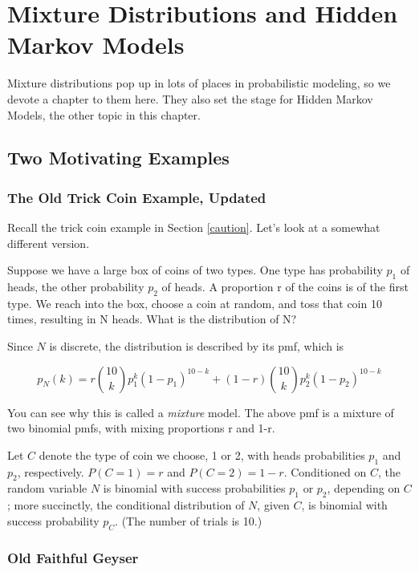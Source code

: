 \chapter{Mixture Distributions and Hidden Markov Models} 
\label{chap:mix}

Mixture distributions pop up in lots of places in probabilistic
modeling, so we devote a chapter to them here.  They also set the stage
for Hidden Markov Models, the other topic in this chapter.

\section{Two Motivating Examples}

\subsection{The Old Trick Coin Example, Updated}
\label{oldtrick}

Recall the trick coin example in Section \ref{caution}.  Let's look at a
somewhat different version.

Suppose we have a large box of coins of two types. One type has
probability $p_1$ of heads, the other probability $p_2$ of heads. A
proportion r of the coins is of the first type. We reach into the box,
choose a coin at random, and toss that coin 10 times, resulting in N
heads. What is the distribution of N?

Since $N$ is discrete, the distribution is described by its pmf, which is

\begin{equation}
\label{mixbinom}
p_N(k) = r \binom{10}{k} p_1^k (1-p_1)^{10-k} +
(1-r) \binom{10}{k} p_2^k (1-p_2)^{10-k}
\end{equation}

You can see why this is called a {\it mixture} model. The above pmf is a
mixture of two binomial pmfs, with mixing proportions r and 1-r.  

Let $C$ denote the type of coin we choose, 1 or 2, with heads
probabilities $p_1$ and $p_2$, respectively.  $P(C = 1) = r$ and
$P(C = 2) = 1-r$.  Conditioned on $C$, the random variable $N$
is binomial with success probabilities $p_1$ or $p_2$, depending on $C$;
more succinctly, the conditional distribution of $N$, given $C$,
is binomial with success probability $p_C$.  (The number of trials is
10.)

\subsection{Old Faithful Geyser}

